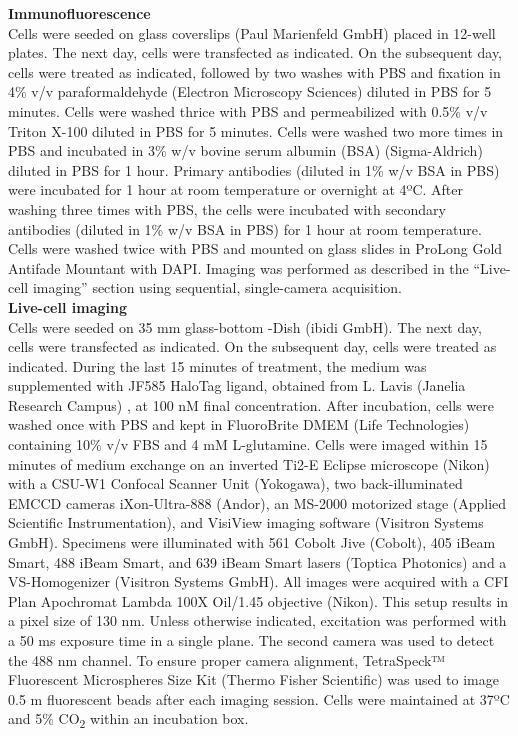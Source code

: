 \textbf{Immunofluorescence} \\
Cells were seeded on glass coverslips (Paul Marienfeld GmbH) placed in 12-well plates.
The next day, cells were transfected as indicated.
On the subsequent day, cells were treated as indicated, followed by two washes with PBS and fixation in 4\% v/v paraformaldehyde (Electron Microscopy Sciences) diluted in PBS for 5 minutes.
Cells were washed thrice with PBS and permeabilized with 0.5\% v/v Triton X-100 diluted in PBS for 5 minutes.
Cells were washed two more times in PBS and incubated in 3\% w/v bovine serum albumin (BSA) (Sigma-Aldrich) diluted in PBS for 1 hour.
Primary antibodies (diluted in 1\% w/v BSA in PBS) were incubated for 1 hour at room temperature or overnight at 4ºC.
After washing three times with PBS, the cells were incubated with secondary antibodies (diluted in 1\% w/v BSA in PBS) for 1 hour at room temperature.
Cells were washed twice with PBS and mounted on glass slides in ProLong Gold Antifade Mountant with DAPI.
Imaging was performed as described in the “Live-cell imaging” section using sequential, single-camera acquisition.
\\

\textbf{Live-cell imaging} \\
Cells were seeded on 35 mm glass-bottom \textmu -Dish (ibidi GmbH).
The next day, cells were transfected as indicated.
On the subsequent day, cells were treated as indicated.
During the last 15 minutes of treatment, the medium was supplemented with JF585 HaloTag ligand, obtained from L. Lavis (Janelia Research Campus) \cite{grimm_general_2015,grimm_general_2017}, at 100 nM final concentration.
After incubation, cells were washed once with PBS and kept in FluoroBrite DMEM (Life Technologies) containing 10\% v/v FBS and 4 mM L-glutamine.
Cells were imaged within 15 minutes of medium exchange on an inverted Ti2-E Eclipse microscope (Nikon) with a CSU-W1 Confocal Scanner Unit (Yokogawa), two back-illuminated EMCCD cameras iXon-Ultra-888 (Andor), an MS-2000 motorized stage (Applied Scientific Instrumentation), and VisiView imaging software (Visitron Systems GmbH).
Specimens were illuminated with 561 Cobolt Jive (Cobolt), 405 iBeam Smart, 488 iBeam Smart, and 639 iBeam Smart lasers (Toptica Photonics) and a VS-Homogenizer (Visitron Systems GmbH).
All images were acquired with a CFI Plan Apochromat Lambda 100X Oil/1.45 objective (Nikon).
This setup results in a pixel size of 130 nm.
Unless otherwise indicated, excitation was performed with a 50 ms exposure time in a single plane.
The second camera was used to detect the 488 nm channel.
To ensure proper camera alignment, TetraSpeck™ Fluorescent Microspheres Size Kit (Thermo Fisher Scientific) was used to image 0.5 \textmu m fluorescent beads after each imaging session.
Cells were maintained at 37ºC and 5\% CO\textsubscript{2} within an incubation box.
\\


